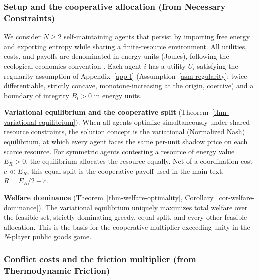 \documentclass[11pt]{article}
\theoremstyle{plain}
\theoremstyle{definition}
\theoremstyle{remark}
\let\origsubsubsection\subsubsection
\renewcommand{\subsubsection}{\needspace{4\baselineskip}\origsubsubsection}
\begin{document}
\subsubsection{Setup and the cooperative allocation (from Necessary
Constraints)}\label{setup-and-the-cooperative-allocation-from-necessary-constraints}

We consider \(N \geq 2\) self-maintaining agents that persist by
importing free energy and exporting entropy while sharing a
finite-resource environment. All utilities, costs, and payoffs are
denominated in energy units (Joules), following the ecological-economics
convention \citep{Lotka1922, GeorgescuRoegen1971, GeorgescuRoegen1979}.
Each agent \(i\) has a utility \(U_i\) satisfying the regularity
assumption of Appendix~\ref{app-I} (Assumption~\ref{asm-regularity}:
twice-differentiable, strictly concave, monotone-increasing at the
origin, coercive) and a boundary of integrity \(B_i > 0\) in energy
units.

\textbf{Variational equilibrium and the cooperative split}
(Theorem~\ref{thm-variational-equilibrium}). When all agents optimize
simultaneously under shared resource constraints, the solution concept
is the variational (Normalized Nash) equilibrium, at which every agent
faces the same per-unit shadow price on each scarce resource. For
symmetric agents contesting a resource of energy value \(E_R > 0\), the
equilibrium allocates the resource equally. Net of a coordination cost
\(c \ll E_R\), this equal split is the cooperative payoff used in the
main text, \(R = E_R/2 - c\).

\textbf{Welfare dominance} (Theorem~\ref{thm-welfare-optimality},
Corollary~\ref{cor-welfare-dominance}). The variational equilibrium
uniquely maximizes total welfare over the feasible set, strictly
dominating greedy, equal-split, and every other feasible allocation.
This is the basis for the cooperative multiplier exceeding unity in the
\(N\)-player public goods game.

\subsubsection{Conflict costs and the friction multiplier (from
Thermodynamic
Friction)}\label{conflict-costs-and-the-friction-multiplier-from-thermodynamic-friction}
\end{document}
